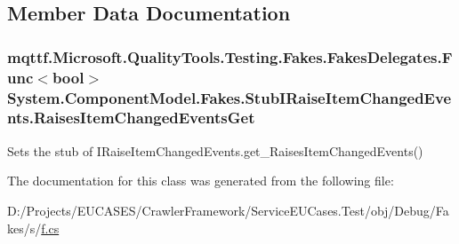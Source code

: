 \subsection{Member Data Documentation}
\hypertarget{class_system_1_1_component_model_1_1_fakes_1_1_stub_i_raise_item_changed_events_ade6d8360375d9288e56e98d136b4847f}{
\subsubsection[{Raises\-Item\-Changed\-Events\-Get}]{\setlength{\rightskip}{0pt plus 5cm}mqttf.\-Microsoft.\-Quality\-Tools.\-Testing.\-Fakes.\-Fakes\-Delegates.\-Func$<$bool$>$ System.\-Component\-Model.\-Fakes.\-Stub\-I\-Raise\-Item\-Changed\-Events.\-Raises\-Item\-Changed\-Events\-Get}}\label{class_system_1_1_component_model_1_1_fakes_1_1_stub_i_raise_item_changed_events_ade6d8360375d9288e56e98d136b4847f}


Sets the stub of I\-Raise\-Item\-Changed\-Events.\-get\-\_\-\-Raises\-Item\-Changed\-Events()



The documentation for this class was generated from the following file\-:\begin{DoxyCompactItemize}
\item 
D\-:/\-Projects/\-E\-U\-C\-A\-S\-E\-S/\-Crawler\-Framework/\-Service\-E\-U\-Cases.\-Test/obj/\-Debug/\-Fakes/s/\hyperlink{s_2f_8cs}{f.\-cs}\end{DoxyCompactItemize}
